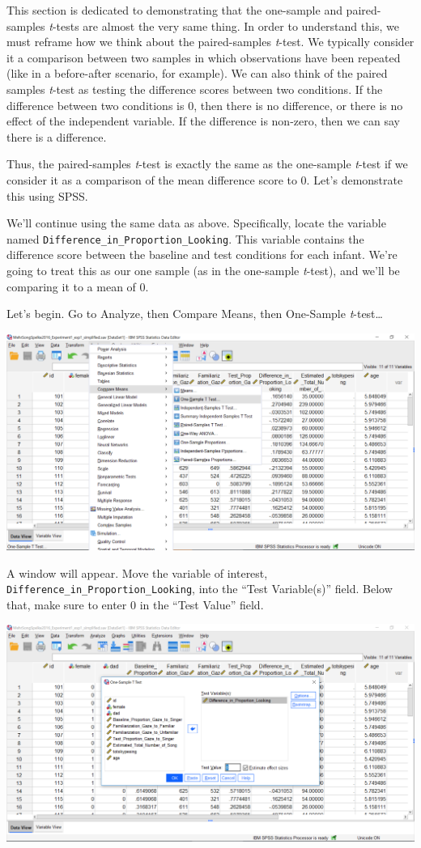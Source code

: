 \documentclass[
]{book}
\begin{document}
This section is dedicated to demonstrating that the one-sample and paired-samples \emph{t}-tests are almost the very same thing. In order to understand this, we must reframe how we think about the paired-samples \emph{t}-test. We typically consider it a comparison between two samples in which observations have been repeated (like in a before-after scenario, for example). We can also think of the paired samples \emph{t}-test as testing the difference scores between two conditions. If the difference between two conditions is 0, then there is no difference, or there is no effect of the independent variable. If the difference is non-zero, then we can say there is a difference.

Thus, the paired-samples \emph{t}-test is exactly the same as the one-sample \emph{t}-test if we consider it as a comparison of the mean difference score to 0. Let's demonstrate this using SPSS.

We'll continue using the same data as above. Specifically, locate the variable named \texttt{Difference\_in\_Proportion\_Looking}. This variable contains the difference score between the baseline and test conditions for each infant. We're going to treat this as our one sample (as in the one-sample \emph{t}-test), and we'll be comparing it to a mean of 0.

Let's begin. Go to {Analyze}, then {Compare Means}, then {One-Sample \emph{t}-test\ldots{}}

\includegraphics{img/6.4.31.png}

A window will appear. Move the variable of interest, \texttt{Difference\_in\_Proportion\_Looking}, into the ``Test Variable(s)'' field. Below that, make sure to enter 0 in the ``Test Value'' field.

\includegraphics{img/6.4.32.png}
\end{document}
